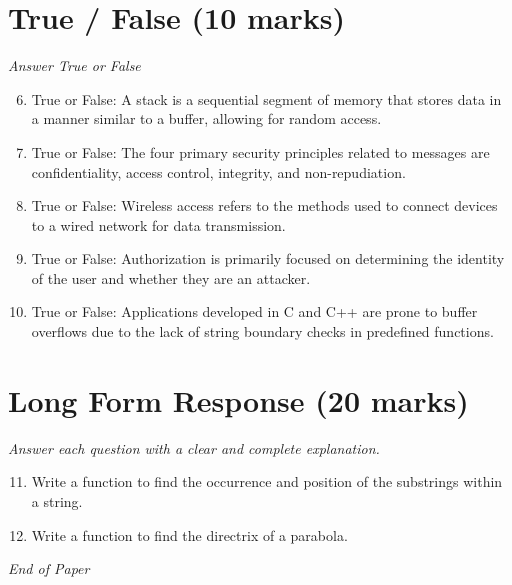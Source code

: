 \documentclass[12pt]{article}
\begin{document}
\section*{True / False (10 marks)}
\textit{Answer True or False}
\begin{enumerate}[label=\arabic*.]
\setcounter{enumi}{5}
\item True or False: A stack is a sequential segment of memory that stores data in a manner similar to a buffer, allowing for random access.
\item True or False: The four primary security principles related to messages are confidentiality, access control, integrity, and non-repudiation.
\item True or False: Wireless access refers to the methods used to connect devices to a wired network for data transmission.
\item True or False: Authorization is primarily focused on determining the identity of the user and whether they are an attacker.
\item True or False: Applications developed in C and C++ are prone to buffer overflows due to the lack of string boundary checks in predefined functions.
\end{enumerate}

\section*{Long Form Response (20 marks)}
\textit{Answer each question with a clear and complete explanation.}
\begin{enumerate}[label=\arabic*.]
\setcounter{enumi}{10}
\item Write a function to find the occurrence and position of the substrings within a string.
\item Write a function to find the directrix of a parabola.
\end{enumerate}

\vfill
\noindent\textit{End of Paper}
\end{document}
